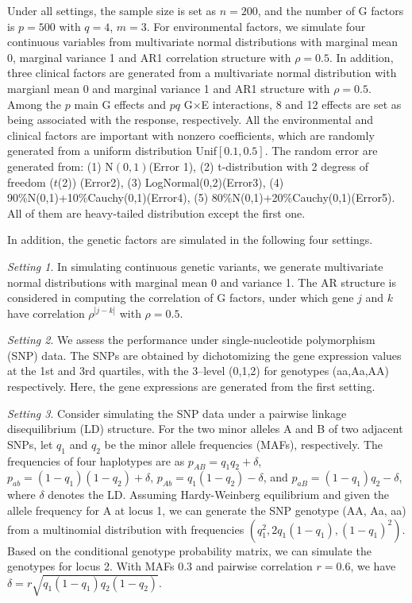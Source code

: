 \documentclass[12pt]{article}
\begin{document}
Under all settings, the sample size is set as $n=200$, and the number of G factors is $p=500$ with $q=4$, $m=3$. For environmental factors, we simulate four continuous variables from multivariate normal distributions with marginal mean 0, marginal variance 1 and AR1 correlation structure with $\rho=0.5$. In addition, three clinical factors are generated from a multivariate normal distribution with margianl mean 0 and marginal variance 1 and AR1 structure with $\rho=0.5$.  Among the $p$ main G effects and $pq$ G$\times $E interactions, 8 and 12 effects are set as being associated with the response, respectively. All the environmental and clinical factors are important with nonzero coefficients, which are randomly generated from a uniform distribution Unif$[0.1, 0.5]$. The random error are generated from: (1) N$(0,1)$(Error 1), (2) t-distribution with 2 degress of freedom ($t$(2)) (Error2), (3) LogNormal(0,2)(Error3), (4) 90\%N(0,1)+10\%Cauchy(0,1)(Error4), (5) 80\%N(0,1)+20\%Cauchy(0,1)(Error5). All of them are heavy-tailed distribution except the first one. 

In addition, the genetic factors are simulated in the following four settings.

\textit{Setting 1}. In simulating continuous genetic variants, we generate multivariate normal distributions with marginal mean 0 and variance 1. The AR structure is considered in computing the correlation of G factors, under which gene $j$ and $k$ have correlation $\rho^{|j-k|}$ with $\rho=0.5$.

\textit{Setting 2}. We assess the performance under single-nucleotide polymorphism (SNP) data. The SNPs are obtained by dichotomizing the gene expression values at the 1st and 3rd quartiles, with the 3--level (0,1,2) for genotypes (aa,Aa,AA) respectively. Here, the gene expressions are generated from the first setting.

\textit{Setting 3}. Consider simulating the SNP data under a pairwise linkage disequilibrium (LD) structure. For the two minor alleles A and B of two adjacent SNPs, let $q_{1}$ and $q_{2}$ be the minor allele frequencies (MAFs), respectively. The frequencies of four haplotypes are as $p_{AB} = q_{1}q_{2} + \delta$, $p_{ab} = (1-q_{1})(1-q_{2})+\delta$, $p_{Ab} = q_{1}(1-q_{2})-\delta$, and $p_{aB} = (1-q_{1})q_{2}-\delta$, where $\delta$ denotes the LD. Assuming Hardy-Weinberg equilibrium and given the allele frequency for A at locus 1, we can generate the SNP genotype (AA, Aa, aa) from a multinomial distribution with frequencies $(q^{2}_{1}, 2q_{1}(1-q_{1}),(1-q_{1})^{2})$. Based on the conditional genotype probability matrix, we can simulate the genotypes for locus 2. With MAFs 0.3 and pairwise correlation $r=0.6$, we have $\delta=r\sqrt{q_{1}(1-q_{1})q_{2}(1-q_{2})}$.
\end{document}
